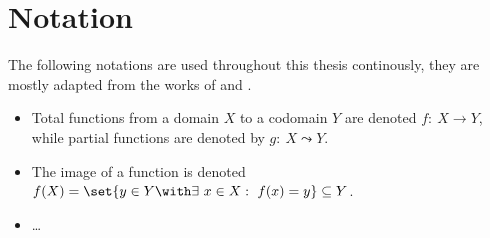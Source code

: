 \chapter{Notation}

The following notations are used throughout this thesis
continously, they are mostly adapted from the works
of \cite{Dijkstra1959} and \cite{Karp1972}.

\begin{itemize}
  \item Total functions from a domain $X$ to a codomain $Y$ are denoted
  $f:\ X \to Y$, while partial functions are denoted by $g:\ X \leadsto Y$.
  \item The image of a function is denoted
  $f(X) = \set{y \in Y \with \exists\ x \in X:\ f(x) = y} \subseteq Y$.
  \item \ldots
\end{itemize}
